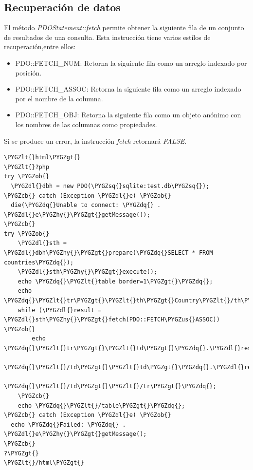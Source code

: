 \documentclass[a5paper,10pt,spanish]{sphinxmanual}
\def\PYGZus{\char`\_}
\def\PYGZob{\char`\{}
\def\PYGZcb{\char`\}}
\def\PYGZlt{\char`\<}
\def\PYGZgt{\char`\>}
\def\PYGZdl{\char`\$}
\def\PYGZhy{\char`\-}
\def\PYGZsq{\char`\'}
\def\PYGZdq{\char`\"}
\begin{document}
\subsection{Recuperación de datos}
\label{Tutorial5_BasesDatos.md:recuperacion-de-datos}
El método \emph{PDOStatement::fetch} permite obtener la siguiente fila de un
conjunto de resultados de una consulta. Esta instrucción tiene varios
estilos de recuperación,entre ellos:
\begin{itemize}
\item {} 
PDO::FETCH\_NUM: Retorna la siguiente fila como un arreglo indexado
por posición.

\item {} 
PDO::FETCH\_ASSOC: Retorna la siguiente fila como un arreglo indexado
por el nombre de la columna.

\item {} 
PDO::FETCH\_OBJ: Retorna la siguiente fila como un objeto anónimo con
los nombres de las columnas como propiedades.

\end{itemize}

Si se produce un error, la instrucción \emph{fetch} retornará \emph{FALSE}.

\begin{Verbatim}[commandchars=\\\{\}]
\PYGZlt{}html\PYGZgt{}
\PYGZlt{}?php
try \PYGZob{}
  \PYGZdl{}dbh = new PDO(\PYGZsq{}sqlite:test.db\PYGZsq{});
\PYGZcb{} catch (Exception \PYGZdl{}e) \PYGZob{}
  die(\PYGZdq{}Unable to connect: \PYGZdq{} . \PYGZdl{}e\PYGZhy{}\PYGZgt{}getMessage());
\PYGZcb{}
try \PYGZob{}
    \PYGZdl{}sth = \PYGZdl{}dbh\PYGZhy{}\PYGZgt{}prepare(\PYGZdq{}SELECT * FROM countries\PYGZdq{});
    \PYGZdl{}sth\PYGZhy{}\PYGZgt{}execute();
    echo \PYGZdq{}\PYGZlt{}table border=1\PYGZgt{}\PYGZdq{};
    echo \PYGZdq{}\PYGZlt{}tr\PYGZgt{}\PYGZlt{}th\PYGZgt{}Country\PYGZlt{}/th\PYGZgt{}\PYGZlt{}th\PYGZgt{}Area\PYGZlt{}/th\PYGZgt{}\PYGZlt{}th\PYGZgt{}People\PYGZlt{}/th\PYGZgt{}\PYGZlt{}th\PYGZgt{}Dens.\PYGZlt{}/th\PYGZgt{}\PYGZlt{}/tr\PYGZgt{}\PYGZdq{};
    while (\PYGZdl{}result = \PYGZdl{}sth\PYGZhy{}\PYGZgt{}fetch(PDO::FETCH\PYGZus{}ASSOC)) \PYGZob{}
        echo \PYGZdq{}\PYGZlt{}tr\PYGZgt{}\PYGZlt{}td\PYGZgt{}\PYGZdq{}.\PYGZdl{}result[\PYGZsq{}name\PYGZsq{}].\PYGZdq{}\PYGZlt{}/td\PYGZgt{}\PYGZlt{}td\PYGZgt{}\PYGZdq{}.\PYGZdl{}result[\PYGZsq{}area\PYGZsq{}].
            \PYGZdq{}\PYGZlt{}/td\PYGZgt{}\PYGZlt{}td\PYGZgt{}\PYGZdq{}.\PYGZdl{}result[\PYGZsq{}population\PYGZsq{}].\PYGZdq{}\PYGZlt{}/td\PYGZgt{}\PYGZlt{}td\PYGZgt{}\PYGZdq{}.\PYGZdl{}result[\PYGZsq{}density\PYGZsq{}].
            \PYGZdq{}\PYGZlt{}/td\PYGZgt{}\PYGZlt{}/tr\PYGZgt{}\PYGZdq{};
    \PYGZcb{}
    echo \PYGZdq{}\PYGZlt{}/table\PYGZgt{}\PYGZdq{};
\PYGZcb{} catch (Exception \PYGZdl{}e) \PYGZob{}
  echo \PYGZdq{}Failed: \PYGZdq{} . \PYGZdl{}e\PYGZhy{}\PYGZgt{}getMessage();
\PYGZcb{}
?\PYGZgt{}
\PYGZlt{}/html\PYGZgt{}
\end{Verbatim}
\end{document}
